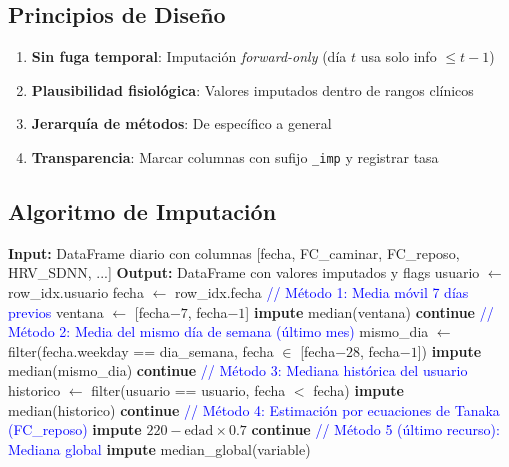 \documentclass[12pt,letterpaper,twoside]{report}
\begin{document}
\subsection{Principios de Diseño}

\begin{enumerate}[noitemsep]
    \item \textbf{Sin fuga temporal}: Imputación \textit{forward-only} (día $t$ usa solo info $\leq t-1$)
    \item \textbf{Plausibilidad fisiológica}: Valores imputados dentro de rangos clínicos
    \item \textbf{Jerarquía de métodos}: De específico a general
    \item \textbf{Transparencia}: Marcar columnas con sufijo \texttt{\_imp} y registrar tasa
\end{enumerate}

\subsection{Algoritmo de Imputación}

\begin{algorithm}[H]
\caption{Imputación Jerárquica para Variables Cardiovasculares}
\label{alg:hierarchical_imputation}
\begin{algorithmic}[1]
\State \textbf{Input:} DataFrame diario con columnas [fecha, FC\_caminar, FC\_reposo, HRV\_SDNN, ...]
\State \textbf{Output:} DataFrame con valores imputados y flags
\State
{}
        \State usuario $\gets$ row\_idx.usuario
        \State fecha $\gets$ row\_idx.fecha
        \State
        \State \textcolor{blue}{// Método 1: Media móvil 7 días previos}
        \State ventana $\gets$ [fecha$-7$, fecha$-1$]
            \State \textbf{impute} median(ventana) 
            \State \textbf{continue}
        \EndIf
        \State
        \State \textcolor{blue}{// Método 2: Media del mismo día de semana (último mes)}
        \State mismo\_dia $\gets$ filter(fecha.weekday == dia\_semana, fecha $\in$ [fecha$-28$, fecha$-1$])
            \State \textbf{impute} median(mismo\_dia)
            \State \textbf{continue}
        \EndIf
        \State
        \State \textcolor{blue}{// Método 3: Mediana histórica del usuario}
        \State historico $\gets$ filter(usuario == usuario, fecha $<$ fecha)
            \State \textbf{impute} median(historico)
            \State \textbf{continue}
        \EndIf
        \State
        \State \textcolor{blue}{// Método 4: Estimación por ecuaciones de Tanaka (FC\_reposo)}
            \State \textbf{impute} $220 - \text{edad} \times 0.7$ 
            \State \textbf{continue}
        \EndIf
        \State
        \State \textcolor{blue}{// Método 5 (último recurso): Mediana global}
        \State \textbf{impute} median\_global(variable)
    \EndFor
\EndFor
\end{algorithmic}
\end{algorithm}
\end{document}
